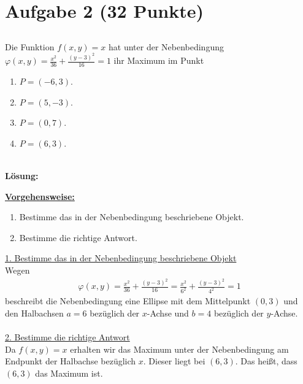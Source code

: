 \section*{Aufgabe 2 (32 Punkte)}
\vspace{0.4cm}
\subsection*{}
Die Funktion $ f(x,y)  = x$ hat unter der Nebenbedingung $\varphi(x,y) = \frac{x^2}{36} + \frac{(y-3)^2}{16} = 1 $ ihr Maximum im Punkt
\renewcommand{\labelenumi}{(\alph{enumi})}
\begin{enumerate}
	\item $ P = (-6,3) $.
	\item $ P = (5,-3) $.
	\item $ P = (0,7) $.
	\item $ P = (6,3) $.
\end{enumerate}
\ \\
\textbf{Lösung:}
\begin{mdframed}
\underline{\textbf{Vorgehensweise:}}
\renewcommand{\labelenumi}{\theenumi.}
\begin{enumerate}
\item Bestimme das in der Nebenbedingung beschriebene Objekt.
\item Bestimme die richtige Antwort.
\end{enumerate}
\end{mdframed}

\underline{1. Bestimme das in der Nebenbedingung beschriebene Objekt}\\
Wegen 
\begin{align*}
\varphi(x,y) = \frac{x^2}{36} + \frac{(y-3)^2}{16} = 
\frac{x^2}{6^2} + \frac{(y-3)^2}{4^2} = 1
\end{align*}
beschreibt die Nebenbedingung eine Ellipse mit dem Mittelpunkt $ (0,3) $ und den Halbachsen $ a = 6 $ bezüglich der $ x $-Achse und $ b = 4 $ bezüglich der $ y $-Achse.\\
\\
\underline{2. Bestimme die richtige Antwort}\\
Da $ f(x,y) = x $ erhalten wir das Maximum unter der Nebenbedingung am Endpunkt der Halbachse bezüglich $ x $. Dieser liegt bei $ (6,3) $. Das heißt, dass $ (6,3) $ das Maximum ist.\\


